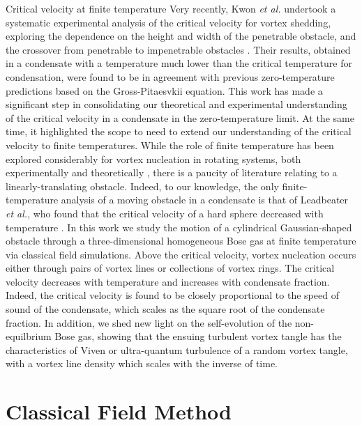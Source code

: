 \begin{chapter}{\label{cha:nonequib}Critical velocity at finite temperature}
Very recently, Kwon {\it et al.} undertook a systematic experimental analysis of the critical velocity for vortex shedding, exploring the dependence on the height and width of the penetrable obstacle, and the crossover from penetrable to impenetrable obstacles \cite{kwon_2015a}.  Their results, obtained in a condensate with a temperature much lower than the critical temperature for condensation, were found to be in agreement with previous zero-temperature predictions based on the Gross-Pitaesvkii equation.  This work has made a significant step in consolidating our theoretical and experimental understanding of the critical velocity in a condensate in the zero-temperature limit.  At the same time, it highlighted the scope to need to extend our understanding of the critical velocity to finite temperatures.  While the role of finite temperature has been explored considerably for vortex nucleation in rotating systems, both experimentally \cite{hodby_2002,abo_shaeer_2002} and theoretically \cite{williams_2002,penckwitt_2002,kasamatsu_2003,lobo_2004}, there is a paucity of literature relating to a linearly-translating obstacle.  Indeed, to our knowledge, the only finite-temperature analysis of a moving obstacle in a condensate is that of Leadbeater {\it et al.}, who found that the critical velocity of a hard sphere decreased with temperature \cite{leadbeater_2003}. 
In this work we study the motion of a cylindrical Gaussian-shaped obstacle through a three-dimensional homogeneous Bose gas at finite temperature via classical field simulations.   Above the critical velocity, vortex nucleation occurs either through pairs of vortex lines or collections of vortex rings.  The critical velocity decreases with temperature and increases with condensate fraction.  Indeed, the critical velocity is found to be closely proportional to the speed of sound of the condensate, which scales as the square root of the condensate fraction.  In addition, we shed new light on the self-evolution of the non-equilbrium Bose gas, showing that the ensuing turbulent vortex tangle has the characteristics of Viven or ultra-quantum turbulence of a random vortex tangle, with a vortex line density which scales with the inverse of time.  





  \section{Classical Field Method}
\label{sec:theory}


\end{chapter}

